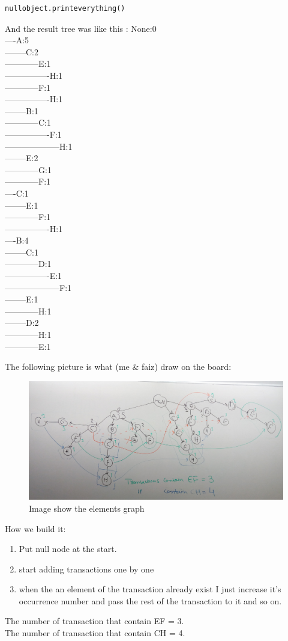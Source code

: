 \documentclass{article}
\begin{document}
\begin{multicols}{2}
\begin{lstlisting}[language=python]
nullobject.printeverything()
	\end{lstlisting}
And the result tree was like this :
None:0\\
----A:5\\
--------C:2\\
------------E:1\\
----------------H:1\\
------------F:1\\
----------------H:1\\
--------B:1\\
------------C:1\\
----------------F:1\\
--------------------H:1\\
--------E:2\\
------------G:1\\
------------F:1\\
----C:1\\
--------E:1\\
------------F:1\\
----------------H:1\\
----B:4\\
--------C:1\\
------------D:1\\
----------------E:1\\
--------------------F:1\\
--------E:1\\
------------H:1\\
--------D:2\\
------------H:1\\
------------E:1\\
\end{multicols}
The following picture is what (me \& faiz) draw on the board:
\begin{figure}[H]
\includegraphics[scale=0.15]{board.jpg}
\caption{Image show the elements graph}
\end{figure}
How we build it:
\begin{enumerate}
	\item Put null node at the start.
	\item start adding transactions one by one
	\item when the an element of the transaction already exist I just increase it's occurrence number and pass the rest of the transaction to it and so on.
\end{enumerate}
The number of transaction that contain EF = 3.\\
The number of transaction that contain CH = 4.
\end{document}
